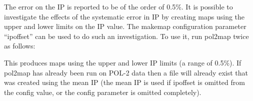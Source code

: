 The error on the IP is reported to be of the order of 0.5\%.
It is possible to investigate the effects of the systematic
error in IP by creating maps using the upper and lower limits on the
IP value. The makemap configuration parameter ``ipoffset'' can be
used to do such an investigation. To use it, run pol2map twice as follows:

\begin{terminalv}
\end{terminalv}

This produces maps using the upper and lower IP limits (a range of
0.5\%). If pol2map has already been run on POL-2 data then a file
will already exist that was created using the
mean IP (the mean IP is used if ipoffset is omitted from the config
value, or the config parameter is omitted completely).




